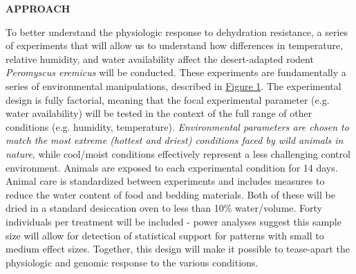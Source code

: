 %
%
%


\noindent \textbf{APPROACH}


To better understand the physiologic response to dehydration resistance, a series of experiments that will allow us to understand how differences in temperature, relative humidity, and water availability affect the desert-adapted rodent \textit{Peromyscus eremicus} will be conducted. These experiments are fundamentally a series of environmental manipulations, described in \hyperlink{Figure 1}{Figure 1}. The experimental design is fully factorial, meaning that the focal experimental parameter (e.g. water availability) will be tested in the context of the full range of other conditions (e.g. humidity, temperature). \emph{Environmental parameters are chosen to match the most extreme (hottest and driest) conditions faced by wild animals in nature}, while cool/moist conditions effectively represent a less challenging control environment. Animals are exposed to each experimental condition for 14 days. Animal care is standardized between experiments and includes measures to reduce the water content of food and bedding materials. Both of these will be dried in a standard desiccation oven to less than 10\% water/volume. Forty individuals per treatment will be included - power analyses suggest this sample size will allow for detection of statistical support for patterns with small to medium effect sizes. Together, this design will make it possible to tease-apart the physiologic and genomic response to the various conditions. \\

\vspace{2mm}

